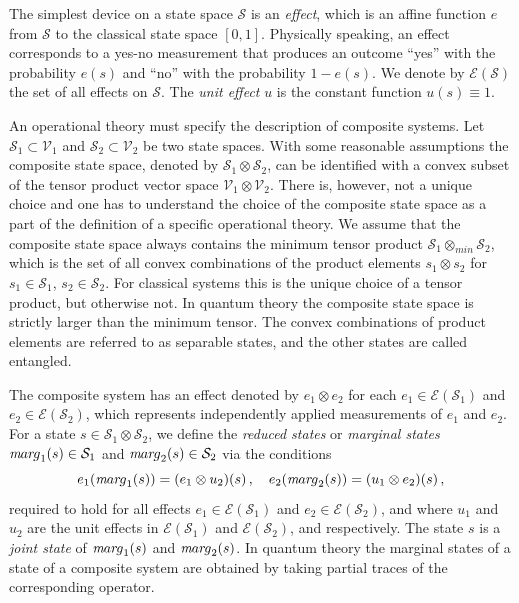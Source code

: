 \documentclass[12pt]{article}
\theoremstyle{definition}
\def\marg{{\textit mar\kern-1pt g}}
\begin{document}
The simplest device on a state space $\mathcal{S}$ is an \emph{effect}, which is an affine function $e$ from $\mathcal{S}$ to the classical state space $[0,1]$. Physically speaking, an effect corresponds to a yes-no measurement that produces an outcome ``yes'' with the probability $e(s)$ and ``no'' with the probability $1-e(s)$. We denote by $\mathcal{E}(\mathcal{S})$ the set of all effects on $\mathcal{S}$. The \emph{unit effect} $u$ is the constant function $u(s)\equiv 1$.

An operational theory must specify the description of composite systems. 
Let $\mathcal{S}_1 \subset \mathcal{V}_1$ and $\mathcal{S}_2 \subset \mathcal{V}_2$ be two state spaces. 
With some reasonable assumptions the composite state space, denoted by $\mathcal{S}_1  \otimes \mathcal{S}_2$, 
can be identified with a convex subset of the tensor product vector space  $\mathcal{V}_1\otimes \mathcal{V}_2$. 
There is, however, not a unique choice \cite{NaPh69} and one has to understand the choice of the composite state space as a part of the definition of a specific operational theory.
We assume that the composite state space always contains the minimum tensor product $\mathcal{S}_1 \otimes_{min} \mathcal{S}_2$, which is the set of all convex combinations of the product elements $s_1\otimes s_2$ 
for $s_1\in\mathcal{S}_1$, $s_2\in\mathcal{S}_2$.
For classical systems this is the unique choice of a tensor product, but otherwise not.  
In quantum theory the composite state space is strictly larger than the minimum tensor. 
The convex combinations of product elements are referred to as separable states, and the other states are called entangled. 


The composite system has an effect denoted by $e_1 \otimes e_2$ 
for each $e_1 \in \mathcal{E}(\mathcal{S}_1)$ and 
$e_2\in \mathcal{E}(\mathcal{S}_2)$, which represents independently applied measurements of 
$e_1$ and $e_2$. 
For a state $s\in\mathcal{S}_1  \otimes \mathcal{S}_2$, we define the \emph{reduced states} or \emph{marginal states} $\marg_1(s)\in\mathcal{S}_1$ and $\marg_2(s)\in\mathcal{S}_2$ via the conditions
\begin{equation}
e_1( \marg_1(s)) = (e_1 \otimes u_2)(s) \, , \quad e_2(\marg_2(s)) = (u_1 \otimes e_2)(s) \, ,
\end{equation}
required to hold for all effects $e_1\in \mathcal{E}(\mathcal{S}_1)$ and $e_2\in\mathcal{E}(\mathcal{S}_2)$, and where $u_1$ and $u_2$ are the unit effects in $\mathcal{E}(\mathcal{S}_1)$ and $\mathcal{E}(\mathcal{S}_2)$, and respectively.
The state $s$ is a \emph{joint state} of $\marg_1(s)$ and $\marg_2(s)$.
In quantum theory the marginal states of a state of a composite system are obtained by taking partial traces of the corresponding operator. 
\end{document}
